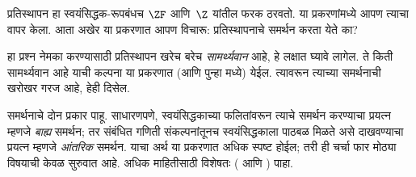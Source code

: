 \documentclass[../../../include/open-logic-section]{subfiles}
\begin{document}

प्रतिस्थापन हा स्वयंसिद्धक-रूपबंधच $\ZF$ आणि~$\Z$ यांतील फरक ठरवतो.  या प्रकरणांमध्ये आपण त्याचा वापर केला. आता अखेर या प्रकरणात आपण विचारू: प्रतिस्थापनाचे समर्थन करता येते का?

हा प्रश्न नेमका करण्यासाठी प्रतिस्थापन खरेच बरेच \emph{सामर्थ्यवान} आहे, हे लक्षात घ्यावे लागेल. ते किती सामर्थ्यवान आहे याची कल्पना या प्रकरणात (आणि पुन्हा  मध्ये) येईल. त्यावरून त्याच्या समर्थनाची खरोखर गरज आहे, हेही दिसेल.

समर्थनाचे दोन प्रकार पाहू. साधारणपणे, स्वयंसिद्धकाच्या फलितांवरून त्याचे समर्थन करण्याचा प्रयत्न म्हणजे \emph{बाह्य} समर्थन; तर संबंधित गणिती संकल्पनांतूनच स्वयंसिद्धकाला पाठबळ मिळते असे दाखवण्याचा प्रयत्न म्हणजे \emph{आंतरिक} समर्थन. याचा अर्थ या प्रकरणात अधिक स्पष्ट होईल; तरी ही चर्चा फार मोठ्या विषयाची केवळ सुरुवात आहे. अधिक माहितीसाठी विशेषतः \citeauthor{Maddy1988a} (\citeyear{Maddy1988a} आणि \citeyear{Maddy1988b}) पाहा.
\end{document}
